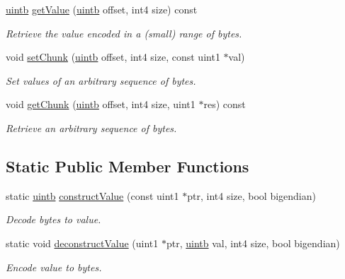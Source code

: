 \begin{DoxyCompactItemize}
\mbox{\hyperlink{types_8h_a2db313c5d32a12b01d26ac9b3bca178f}{uintb}} \mbox{\hyperlink{class_memory_bank_a8149ad04fb877f78b56abd1b67962b31}{get\+Value}} (\mbox{\hyperlink{types_8h_a2db313c5d32a12b01d26ac9b3bca178f}{uintb}} offset, int4 size) const
\begin{DoxyCompactList}\small\item\em Retrieve the value encoded in a (small) range of bytes. \end{DoxyCompactList}\item 
void \mbox{\hyperlink{class_memory_bank_a99ed4c66d1ea57306e6bd9ed1a5de787}{set\+Chunk}} (\mbox{\hyperlink{types_8h_a2db313c5d32a12b01d26ac9b3bca178f}{uintb}} offset, int4 size, const uint1 $\ast$val)
\begin{DoxyCompactList}\small\item\em Set values of an arbitrary sequence of bytes. \end{DoxyCompactList}\item 
void \mbox{\hyperlink{class_memory_bank_af45a81a70ff478940fac0399a2cfbe86}{get\+Chunk}} (\mbox{\hyperlink{types_8h_a2db313c5d32a12b01d26ac9b3bca178f}{uintb}} offset, int4 size, uint1 $\ast$res) const
\begin{DoxyCompactList}\small\item\em Retrieve an arbitrary sequence of bytes. \end{DoxyCompactList}\end{DoxyCompactItemize}
\subsection*{Static Public Member Functions}
\begin{DoxyCompactItemize}
\item 
static \mbox{\hyperlink{types_8h_a2db313c5d32a12b01d26ac9b3bca178f}{uintb}} \mbox{\hyperlink{class_memory_bank_aeba21f6794e4fa90b9acf48f4bef7278}{construct\+Value}} (const uint1 $\ast$ptr, int4 size, bool bigendian)
\begin{DoxyCompactList}\small\item\em Decode bytes to value. \end{DoxyCompactList}\item 
static void \mbox{\hyperlink{class_memory_bank_ab0cc660245fbe563982d49d68b6d2e02}{deconstruct\+Value}} (uint1 $\ast$ptr, \mbox{\hyperlink{types_8h_a2db313c5d32a12b01d26ac9b3bca178f}{uintb}} val, int4 size, bool bigendian)
\begin{DoxyCompactList}\small\item\em Encode value to bytes. \end{DoxyCompactList}\end{DoxyCompactItemize}
